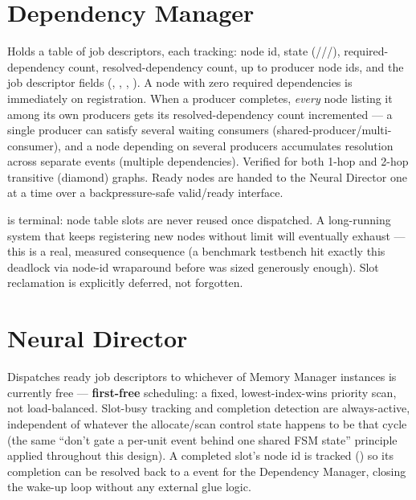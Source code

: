 \section{Dependency Manager}
Holds a table of  job descriptors, each tracking: node
id, state (///),
required-dependency count, resolved-dependency count, up to
 producer node ids, and the job descriptor fields
(, , , ). A
node with zero required dependencies is immediately  on
registration. When a producer completes, \emph{every} 
node listing it among its own producers gets its resolved-dependency
count incremented --- a single producer can satisfy several waiting
consumers (shared-producer/multi-consumer), and a node depending on
several producers accumulates resolution across separate events
(multiple dependencies). Verified for both 1-hop and 2-hop transitive
(diamond) graphs. Ready nodes are handed to the Neural Director one at a
time over a backpressure-safe valid/ready interface.

\begin{fnwarn}
 is terminal: node table slots are never reused
once dispatched. A long-running system that keeps registering new
nodes without limit will eventually exhaust  --- this is
a real, measured consequence (a benchmark testbench hit exactly this
deadlock via node-id wraparound before  was sized
generously enough). Slot reclamation is explicitly deferred, not
forgotten.
\end{fnwarn}

\section{Neural Director}
Dispatches ready job descriptors to whichever of  Memory
Manager instances is currently free --- \textbf{first-free} scheduling: a
fixed, lowest-index-wins priority scan, not load-balanced. Slot-busy
tracking and completion detection are always-active, independent of
whatever the allocate/scan control state happens to be that cycle (the
same ``don't gate a per-unit event behind one shared FSM state''
principle applied throughout this design). A completed slot's node id
is tracked () so its completion can be resolved back
to a  event for the Dependency Manager, closing the
wake-up loop without any external glue logic.

